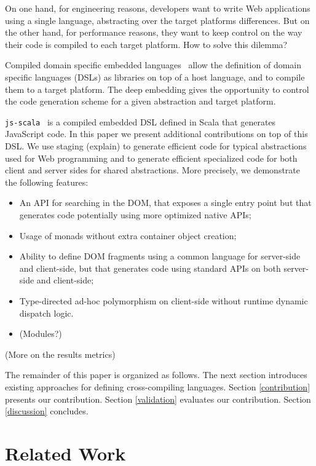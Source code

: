 \documentclass[preprint]{sigplanconf}
\begin{document}
On one hand, for engineering reasons, developers want to write Web applications using a single language, abstracting
over the target platforms differences. But on the other hand, for performance reasons, they want to keep
control on the way their code is compiled to each target platform. How to solve this dilemma?

Compiled domain specific embedded languages~\cite{Elliott2003_Compiling} allow the definition of domain specific
languages (DSLs) as libraries on top of a host language, and to compile them to a target platform. The deep embedding
gives the opportunity to control the code generation scheme for a given abstraction and target platform.

\texttt{js-scala}~\cite{Kossakowski12_JsDESL} is a compiled embedded DSL defined in Scala that generates JavaScript
code. In this paper we present additional contributions on top of this DSL. We use staging (explain) to generate
efficient code for typical abstractions used for Web programming and to generate efficient specialized code for both
client and server sides for shared abstractions. More precisely, we demonstrate the following features:

\begin{itemize}
 \item An API for searching in the DOM, that exposes a single entry point but that generates code potentially using
more optimized native APIs;
 \item Usage of monads without extra container object creation;
 \item Ability to define DOM fragments using a common language for server-side and client-side, but that generates
code using standard APIs on both server-side and client-side;
 \item Type-directed ad-hoc polymorphism on client-side without runtime dynamic dispatch logic.
 \item (Modules?)
\end{itemize}

(More on the results metrics)

The remainder of this paper is organized as follows. The next section introduces existing approaches for defining
cross-compiling languages. Section \ref{contribution} presents our contribution. Section \ref{validation} evaluates
our contribution. Section \ref{discussion} concludes.

\section{Related Work}
\end{document}
